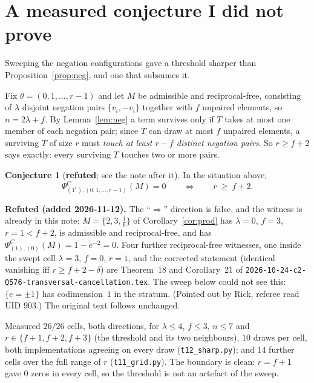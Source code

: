 \documentclass[11pt]{article}
\theoremstyle{definition}
\newtheorem{conjecture}[theorem]{Conjecture}
\theoremstyle{remark}
\newcommand{\PsiC}{\Psi^{C}}
\begin{document}
\section{A measured conjecture I did not prove}

Sweeping the negation configurations gave a threshold sharper than
Proposition~\ref{prop:neg}, and one that subsumes it.

Fix $\theta=(0,1,\dots,r-1)$ and let $M$ be admissible and reciprocal-free,
consisting of $\lambda$ disjoint negation pairs $\{v_i,-v_i\}$ together with $f$
unpaired elements, so $n=2\lambda+f$. By Lemma~\ref{lem:neg} a term survives only
if $T$ takes at most one member of each negation pair; since $T$ can draw at most
$f$ unpaired elements, a surviving $T$ of size $r$ must \emph{touch at least
$r-f$ distinct negation pairs}. So $r\ge f+2$ says exactly: every surviving $T$
touches two or more pairs.

\begin{conjecture}[\textbf{refuted}; see the note after it]\label{conj:transversal}
In the situation above,
\[
  \PsiC_{(1^r),(0,1,\dots,r-1)}(M)=0
  \qquad\Longleftrightarrow\qquad
  r\ \ge\ f+2 .
\]
\end{conjecture}

\noindent\textbf{Refuted (added 2026-11-12).} The ``$\Rightarrow$'' direction is false,
and the witness is already in this note: $M=\{2,3,\tfrac16\}$ of
Corollary~\ref{cor:prod} has $\lambda=0$, $f=3$, $r=1<f+2$, is admissible and
reciprocal-free, and has $\PsiC_{(1),(0)}(M)=1-e^{-2}=0$. Four further reciprocal-free
witnesses, one inside the swept cell $\lambda=3$, $f=0$, $r=1$, and the corrected
statement (identical vanishing iff $r\ge f+2-\delta$) are Theorem~18 and Corollary~21 of
\texttt{2026-10-24-c2-Q576-transversal-cancellation.tex}. The sweep below could not see
this: $\{e=\pm1\}$ has codimension~$1$ in the stratum. (Pointed out by Rick, referee read
UID 903.) The original text follows unchanged.

Measured $26/26$ cells, both directions, for $\lambda\le4$, $f\le3$, $n\le7$ and
$r\in\{f+1,f+2,f+3\}$ (the threshold and its two neighbours), $10$ draws per cell,
both implementations agreeing on every draw (\texttt{t12\_sharp.py}); and $14$
further cells over the full range of $r$ (\texttt{t11\_grid.py}). The boundary is
clean: $r=f+1$ gave $0$ zeros in every cell, so the threshold is not an artefact
of the sweep.
\end{document}

